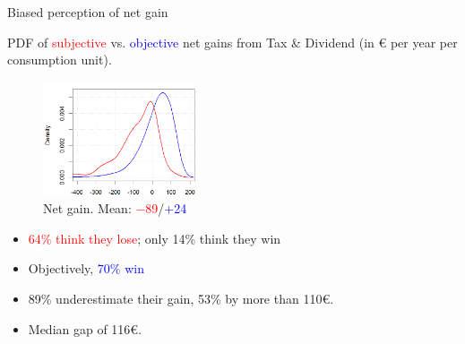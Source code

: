 \documentclass[aspectratio=169,9pt,dvipsnames]{beamer}
\begin{document}
    \begin{frame}{Biased perception of net gain}\label{biased_perception_PDF}


PDF of \textcolor{red}{subjective} vs. \textcolor{blue}{objective} net gains from Tax \& Dividend 
(in \euro{} per year per consumption unit). \hyperlink{biased_perception_CDF}{}

\begin{figure}
  \includegraphics[width=0.4\textwidth]{Images/pdf_carbon_tax.png}
  \caption{Net gain. Mean: \textcolor{red}{$-$89}/\textcolor{blue}{+24}}
\end{figure}

\begin{itemize}
    \item \textcolor{red}{64\% think they lose}; only 14\% think they win
    \item Objectively, \textcolor{blue}{70\% win}
    \item 89\% underestimate their gain, 53\% by more than 110\euro{}. 
    \item Median gap of 116\euro{}.
\end{itemize}

    \end{frame}
\end{document}
